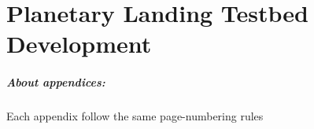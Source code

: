 \chapter{Planetary Landing Testbed Development}	%

\paragraph{About appendices:}
	Each appendix follow the same page-numbering rules



